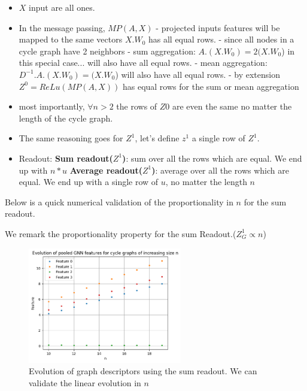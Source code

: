 \documentclass[a4paper]{article}
\begin{document}
\begin{itemize}
    \item $X$ input are all ones.
    \item In the message passing, $MP(A, X)$ 
        \subitem - projected inputs features will be mapped to the same vectors $X.W_{0}$ has all equal rows.
        \subitem - since all nodes in a cycle graph have 2 neighbors
        \subitem - sum aggregation: $A.(X.W_{0}) = 2(X.W_{0}$) in this special case... will also have all equal rows.
        \subitem - mean aggregation: $D^{-1}.A.(X.W_{0}) = (X.W_{0}$) will also have all equal rows.
        \subitem - by extension $Z^{0} = ReLu(MP(A, X))$ has equal rows for the sum or mean aggregation
    \item most importantly, $\forall{n} > 2$ the rows of $Z{0}$ are even the same no matter the length of the cycle graph.
    \item The same reasoning goes for $Z^{1}$, let's define $z^{1}$ a single row of $Z^{1}$.
    \item Readout:
        \subitem  \textbf{Sum readout($Z^1$)}: sum over all the rows which are equal. We end up with $n*u$
        \subitem  \textbf{Average readout($Z^1$)}: average over all the rows which are equal. We end up with a single row of $u$, no matter the length $n$
\end{itemize}
Below is a quick numerical validation of the proportionality in $n$ for the sum readout.

\break

We remark the proportionality property for the sum Readout.($Z^{1}_{G} \propto{n}$)


\begin{figure}[ht]
    \centering
    \includegraphics[width=0.6\textwidth]{figures/features_evolution.png}
    \caption{Evolution of graph descriptors using the sum readout. We can validate the linear evolution in $n$ }
    \label{fig:node_embeddings}
\end{figure}
\end{document}
